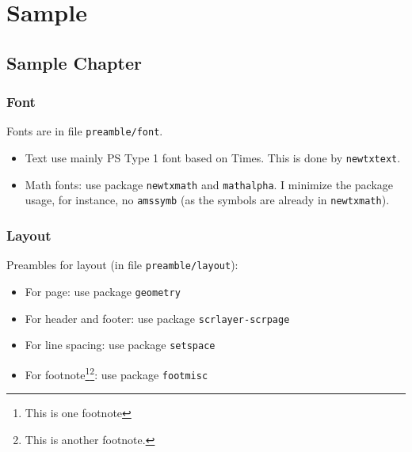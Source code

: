 \documentclass[%
	12pt, %
]{scrbook} %
\begin{document}
\frontmatter
\maketitle
\tableofcontents
\listoffigures
\listoftables
\begin{abstract}
	
\end{abstract}
\begin{dedication}
	
\end{dedication}
\begin{acknowledgement}
	
\end{acknowledgement}
\mainmatter
\part{Sample}
\chapter{Sample Chapter}
\section{Font}
Fonts are in file \texttt{preamble/font}. 
\begin{itemize}
	\item Text use mainly PS Type 1 font based on Times. This is done by \texttt{newtxtext}.
	\item Math fonts: use package \texttt{newtxmath} and \texttt{mathalpha}. I minimize the package usage, for instance, no \texttt{amssymb} (as the symbols are already in \texttt{newtxmath}).
\end{itemize}
\section{Layout}
Preambles for layout (in file \texttt{preamble/layout}):
\begin{itemize}
	\item For page: use package \texttt{geometry}
	\item For header and footer: use package \texttt{scrlayer-scrpage}
	\item For line spacing: use package \texttt{setspace}
	\item For footnote\footnote{This is one footnote}\footnote{This is another footnote.}: use package \texttt{footmisc}
\end{itemize}
\end{document}
